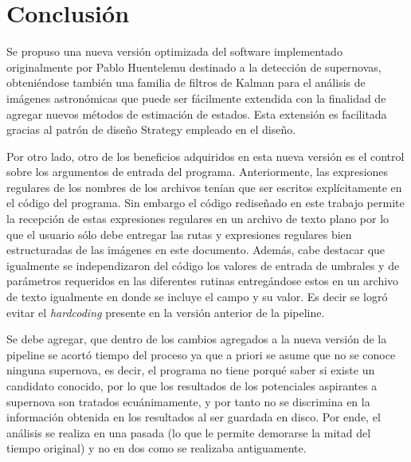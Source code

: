 \chapter{Conclusi\'on}
\label{ch:conclusion}

Se propuso una nueva versi\'on optimizada del software implementado originalmente por Pablo Huentelemu destinado a la detecci\'on de supernovas, obteni\'endose tambi\'en una familia de filtros de Kalman para el an\'alisis de im\'agenes astron\'omicas que puede ser f\'acilmente extendida con la finalidad de agregar nuevos m\'etodos de estimaci\'on de estados. Esta extensi\'on es facilitada gracias al patr\'on de dise\~no Strategy empleado en el dise\~no.
\bigskip

Por otro lado, otro de los beneficios adquiridos en esta nueva versi\'on es el control sobre los argumentos de entrada del programa. Anteriormente, las expresiones regulares de los nombres de los archivos ten\'ian que ser escritos expl\'icitamente en el c\'odigo del programa. Sin embargo el c\'odigo redise\~nado en este trabajo permite la recepci\'on de estas expresiones regulares en un archivo de texto plano por lo que el usuario s\'olo debe entregar las rutas y expresiones regulares bien estructuradas de las im\'agenes en este documento. Adem\'as, cabe destacar que igualmente se independizaron del c\'odigo los valores de entrada de umbrales y de par\'ametros requeridos en las diferentes rutinas entreg\'andose estos en un  archivo de texto igualmente en donde se incluye el campo y su valor. Es decir se logr\'o evitar el \textit{hardcoding} presente en la versi\'on anterior de la pipeline.
\bigskip

Se debe agregar, que dentro de los cambios agregados a la nueva versi\'on de la pipeline se acort\'o tiempo del proceso ya que a priori se asume que no se conoce ninguna supernova, es decir, el programa no tiene porqu\'e saber si existe un candidato conocido, por lo que los resultados de los potenciales aspirantes a supernova son tratados ecu\'animamente, y por tanto no se discrimina en la informaci\'on obtenida en los resultados al ser guardada en disco. Por ende, el an\'alisis se realiza en una pasada (lo que le permite demorarse la mitad del tiempo original) y no en dos como se realizaba antiguamente.
\bigskip

